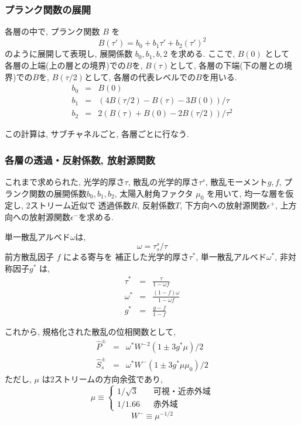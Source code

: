 \subsubsection{プランク関数の展開 }

各層の中で, プランク関数 $B$ を
\begin{equation}
  B(\tau') = b_0 + b_1 \tau' + b_2 \left(\tau'\right)^2
\end{equation}
のように展開して表現し, 展開係数 $b_0, b_1, b,2$ を求める.
ここで, $B(0)$ として
各層の上端(上の層との境界)での$B$を,
$B(\tau)$として, 各層の下端(下の層との境界)での$B$を,
$B(\tau/2)$として, 各層の代表レベルでの$B$を用いる.
\begin{eqnarray}
  b_0 & = & B(0) \nonumber \\
  b_1 & = & ( 4B(\tau/2) - B(\tau) - 3B(0) )/\tau  \\
  b_2 & = & 2 ( B(\tau) + B(0) - 2B(\tau/2) )/\tau^2  \nonumber
\end{eqnarray}

この計算は, サブチャネルごと, 各層ごとに行なう.

\subsubsection{各層の透過・反射係数, 放射源関数 }

これまで求められた, 光学的厚さ$\tau$, 散乱の光学的厚さ$\tau^s$,
散乱モーメント$g, f$, プランク関数の展開係数$b_0, b_1, b_2$,
太陽入射角ファクタ $\mu_0$ を用いて,
均一な層を仮定し, 2ストリーム近似で
透過係数$R$, 反射係数$T$, 下方向への放射源関数$\epsilon^+$,
上方向への放射源関数$\epsilon^-$を求める.

単一散乱アルベド$\omega$は,
\begin{equation}
  \omega = \tau_s^s/\tau
\end{equation}
前方散乱因子 $f$ による寄与を
補正した光学的厚さ$\tau^*$,
単一散乱アルベド$\omega^*$, 非対称因子$g^*$ は,
\begin{eqnarray}
  \tau^* & = & \frac{\tau}{1-\omega f} \\
  \omega^* & = & \frac{(1-f)\omega}{1-\omega f}   \\
  g^* & = & \frac{g-f}{1-f}  
\end{eqnarray}

これから, 規格化された散乱の位相関数として,
\begin{eqnarray}
  \hat{P}^\pm   & = & \omega^* {W^-}^2 \left( 1 \pm 3g^* \mu \right)/2 \\
  \hat{S}_s^\pm & = & \omega^* W^-     \left( 1 \pm 3g^* \mu \mu_0 \right)/2
\end{eqnarray}
ただし, $\mu$ は2ストリームの方向余弦であり,
\begin{equation}
  \mu \equiv \left\{ \begin{array}{ll}
                   1/\sqrt{3} \; \; \; & 可視・近赤外域 \\
                   1/1.66     \; \; \; & 赤外域
                    \end{array}
             \right.
\end{equation}
\begin{equation}
  W^- \equiv \mu^{-1/2}
\end{equation}

